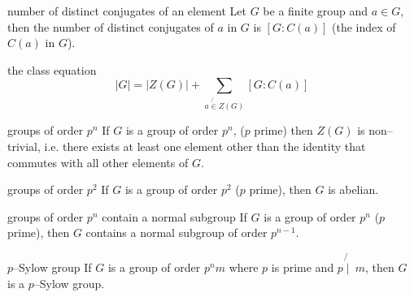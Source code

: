 \documentclass[avery5371,grid]{flashcards}
\begin{document}
\begin{flashcard}[Theorem]{number of distinct conjugates of an element}
Let $G$ be a finite group and $a \in G$, then the number of distinct
conjugates of $a$ in $G$ is $[G : C(a)]$ (the index of $C(a)$ in $G$).
\end{flashcard}

\begin{flashcard}[Theorem]{the class equation}
\begin{equation*}
|G| = |Z(G)| + \sum_{a \not{\in} Z(G)}[G : C(a)]
\end{equation*}
\end{flashcard}

\begin{flashcard}[Theorem]{groups of order $p^{n}$}
If $G$ is a group of order $p^{n}$, ($p$ prime) then $Z(G)$ is
non--trivial, i.e. there exists at least one element other than
the identity that commutes with all other elements of $G$.
\end{flashcard}

\begin{flashcard}[Theorem]{groups of order $p^{2}$}
If $G$ is a group of order $p^{2}$ ($p$ prime), then $G$ is abelian.
\end{flashcard}

\begin{flashcard}[Theorem]{groups of order $p^{n}$ contain a normal 
subgroup}
If $G$ is a group of order $p^{n}$ ($p$ prime), then $G$ contains
a normal subgroup of order $p^{n-1}$.
\end{flashcard}

\begin{flashcard}[Definition]{$p$--Sylow group}
If $G$ is a group of order $p^{n}m$ where $p$ is prime and 
$p \not{\mid} \: m$, then $G$ is a $p$--Sylow group.
\end{flashcard}
\end{document}
